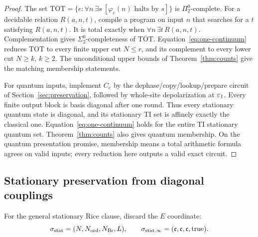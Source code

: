 \begin{proof}
The set \(\mathrm{TOT}=\{e:\forall n\ \exists s\
[\varphi_e(n)\text{ halts by }s]\}\) is \(\Pi^0_2\)-complete.
For a decidable relation \(R(a,n,t)\), compile a program on
input \(n\) that searches for a \(t\) satisfying \(R(a,n,t)\).
It is total exactly when \(\forall n\,\exists t\,R(a,n,t)\).
Complementation gives \(\Sigma^0_2\)-completeness of
\(\overline{\mathrm{TOT}}\). Equation~\eqref{eq:one-continuum}
reduces \(\mathrm{TOT}\) to every finite upper cut \(N\le r\),
and its complement to every lower cut \(N\ge k\), \(k\ge2\).
The unconditional upper bounds of Theorem~\ref{thm:counts}
give the matching membership statements.

For quantum inputs, implement \(C_e\) by the
dephase/copy/lookup/prepare circuit of
Section~\ref{sec:preservation}, followed by whole-site
depolarization at \(\varepsilon_1\). Every finite output block is
basis diagonal after one round. Thus every stationary quantum
state is diagonal, and its stationary TI set is affinely exactly
the classical one. Equation~\eqref{eq:one-continuum} holds for
the entire TI stationary quantum set. Theorem~\ref{thm:counts} also
gives quantum membership. On the quantum presentation promise,
membership means a total arithmetic formula agrees on valid
inputs; every reduction here outputs a valid exact circuit.
\end{proof}

\subsection{Stationary preservation from diagonal couplings}
For the general stationary Rice clause, discard the \(E\) coordinate:
\[
 \sigma_{\mathrm{stat}}=(N,N_{\mathrm{ord}},N_{\mathrm{Br}},L),\qquad
 \sigma_{\mathrm{stat},\infty}=(\mathfrak c,\mathfrak c,\mathfrak c,\mathrm{true}).
\]

